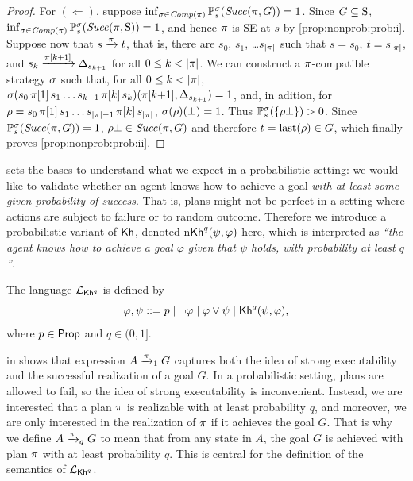 \begin{proof}
  For $(\Leftarrow)$, suppose
  $\inf_{\strat\in\Comp(\plan)}\Prob^\strat_s(\Succ(\plan,G))=1$.
  Since $G\subseteq\S$,
  $\inf_{\strat\in\Comp(\plan)}\Prob^\strat_s(\Succ(\plan,\S))=1$, and
  hence $\plan$ is SE at $s$ by \cref{prop:nonprob:prob:i}.
  Suppose now that $s \reach{\plan} t$, that is, there are $s_0$,
  $s_1$, \ldots $s_{\size{\plan}}$ such that $s=s_0$, $t=s_{\size{\plan}}$, and
  $s_k\reach{\plan[k{+}1]}\Dirac_{s_{k{+}1}}$ for all $0\leq k < \size{\plan}$.
  We can construct a $\plan$-compatible strategy $\strat$
  such that, for all $0\leq k < \size{\plan}$,
  $\strat(s_0\,\plan[1]\,s_1\ldots s_{k{-}1}\,\plan[k]\,s_k)(\plan[k{+}1],\Dirac_{s_{k{+}1}})=1$,
  and, in adition, for
  $\rho = s_0\,\plan[1]\,s_1\ldots s_{\size{\plan}{-}1}\,\plan[k]\,s_{\size{\plan}}$,
  $\strat(\rho)(\complete)=1$.
  Thus $\Prob^\strat_s(\{\rho\bot\})>0$.  Since
  $\Prob^\strat_s(\Succ(\plan,G))=1$, $\rho\bot\in\Succ(\plan,G)$
  and therefore $t=\last(\rho)\in G$, which finally proves
  \cref{prop:nonprob:prob:ii}.
\end{proof}


 sets the bases to understand what we expect in
a probabilistic setting: we would like to validate whether an agent
knows how to achieve a goal \emph{with at least some given probability
of success}.  That is, plans might not be perfect in a setting where
actions are subject to failure or to random outcome.
%
Therefore we introduce a probabilistic variant of $\kh$,
denoted n$\kh^q(\psi,\varphi)$ here, which is interpreted as \emph{``the agent knows
how to achieve a goal $\varphi$ given that $\psi$ holds, with
probability at least $q$''}.


\begin{definition}\label{def:syntax:PKh}
  The language $\PKh$ is defined by
  \[
  \varphi, \psi ::=
  p \mid \neg \varphi \mid \varphi \vee \psi \mid \kh^q(\psi,\varphi),
  \]
  where $p\in\Prop$ and $q\in(0,1]$.
\end{definition}


 in  shows that
expression $A\reach{\plan}_1 G$ captures both the idea of strong
executability and the successful realization of a goal $G$.  In a
probabilistic setting, plans are allowed to fail, so the idea of
strong executability is inconvenient.  Instead, we are interested that
a plan $\plan$ is realizable with at least probability $q$, and
moreover, we are only interested in the realization of $\plan$ if it
achieves the goal $G$.  That is why we define $A\reach{\plan}_q G$ to
mean that from any state in $A$, the goal $G$ is achieved with plan
$\plan$ with at least probability $q$.  This is central for the
definition of the semantics of $\PKh$.

